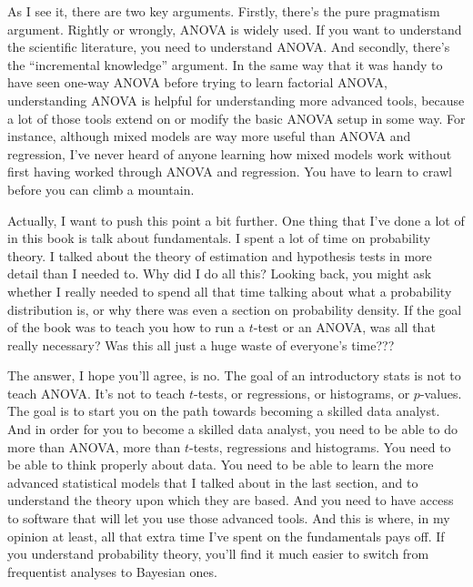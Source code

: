 \documentclass[
  a4paper,
]{book}
\begin{document}
As I see it, there are two key arguments. Firstly, there's the pure
pragmatism argument. Rightly or wrongly, ANOVA is widely used. If you
want to understand the scientific literature, you need to understand
ANOVA. And secondly, there's the ``incremental knowledge'' argument. In
the same way that it was handy to have seen one-way ANOVA before trying
to learn factorial ANOVA, understanding ANOVA is helpful for
understanding more advanced tools, because a lot of those tools extend
on or modify the basic ANOVA setup in some way. For instance, although
mixed models are way more useful than ANOVA and regression, I've never
heard of anyone learning how mixed models work without first having
worked through ANOVA and regression. You have to learn to crawl before
you can climb a mountain.

Actually, I want to push this point a bit further. One thing that I've
done a lot of in this book is talk about fundamentals. I spent a lot of
time on probability theory. I talked about the theory of estimation and
hypothesis tests in more detail than I needed to. Why did I do all this?
Looking back, you might ask whether I really needed to spend all that
time talking about what a probability distribution is, or why there was
even a section on probability density. If the goal of the book was to
teach you how to run a \(t\)-test or an ANOVA, was all that really
necessary? Was this all just a huge waste of everyone's time???

The answer, I hope you'll agree, is no. The goal of an introductory
stats is not to teach ANOVA. It's not to teach \(t\)-tests, or
regressions, or histograms, or \(p\)-values. The goal is to start you on
the path towards becoming a skilled data analyst. And in order for you
to become a skilled data analyst, you need to be able to do more than
ANOVA, more than \(t\)-tests, regressions and histograms. You need to be
able to think properly about data. You need to be able to learn the more
advanced statistical models that I talked about in the last section, and
to understand the theory upon which they are based. And you need to have
access to software that will let you use those advanced tools. And this
is where, in my opinion at least, all that extra time I've spent on the
fundamentals pays off. If you understand probability theory, you'll find
it much easier to switch from frequentist analyses to Bayesian ones.
\end{document}
